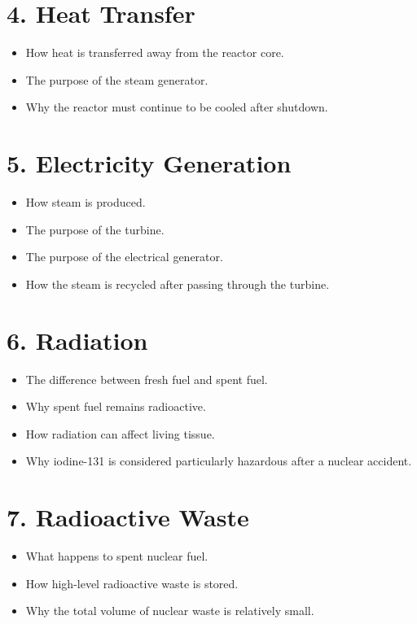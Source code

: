 \documentclass[11pt,a4paper]{article}
\begin{document}
\section*{4. Heat Transfer}

\begin{itemize}[leftmargin=*]
    \item How heat is transferred away from the reactor core.
    \item The purpose of the steam generator.
    \item Why the reactor must continue to be cooled after shutdown.
\end{itemize}

\section*{5. Electricity Generation}

\begin{itemize}[leftmargin=*]
    \item How steam is produced.
    \item The purpose of the turbine.
    \item The purpose of the electrical generator.
    \item How the steam is recycled after passing through the turbine.
\end{itemize}

\section*{6. Radiation}

\begin{itemize}[leftmargin=*]
    \item The difference between fresh fuel and spent fuel.
    \item Why spent fuel remains radioactive.
    \item How radiation can affect living tissue.
    \item Why iodine-131 is considered particularly hazardous after a nuclear accident.
\end{itemize}

\section*{7. Radioactive Waste}

\begin{itemize}[leftmargin=*]
    \item What happens to spent nuclear fuel.
    \item How high-level radioactive waste is stored.
    \item Why the total volume of nuclear waste is relatively small.
\end{itemize}
\end{document}
